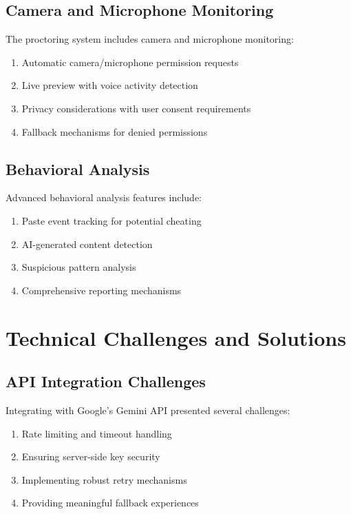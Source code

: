 \documentclass[12pt, conference]{IEEEtran}
\begin{document}
\subsection{Camera and Microphone Monitoring}

The proctoring system includes camera and microphone monitoring:
\begin{enumerate}
    \item Automatic camera/microphone permission requests
    \item Live preview with voice activity detection
    \item Privacy considerations with user consent requirements
    \item Fallback mechanisms for denied permissions
\end{enumerate}

\subsection{Behavioral Analysis}

Advanced behavioral analysis features include:
\begin{enumerate}
    \item Paste event tracking for potential cheating
    \item AI-generated content detection
    \item Suspicious pattern analysis
    \item Comprehensive reporting mechanisms
\end{enumerate}

\section{Technical Challenges and Solutions}

\subsection{API Integration Challenges}

Integrating with Google's Gemini API presented several challenges:
\begin{enumerate}
    \item Rate limiting and timeout handling
    \item Ensuring server-side key security
    \item Implementing robust retry mechanisms
    \item Providing meaningful fallback experiences
\end{enumerate}
\end{document}
